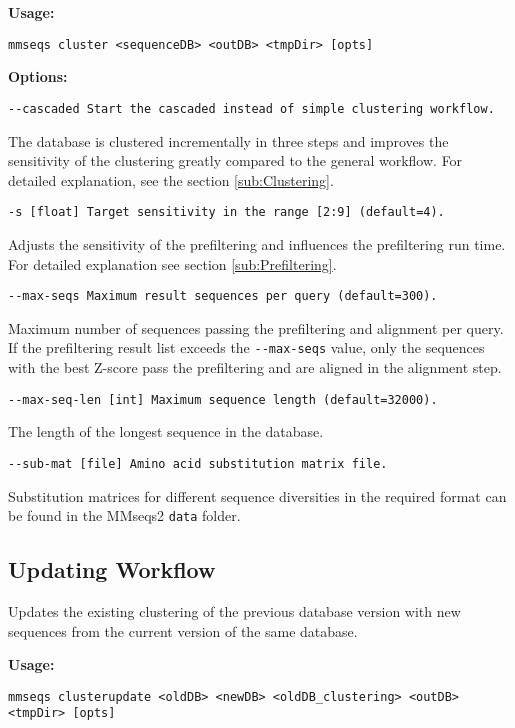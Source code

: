 \documentclass[11pt,a4paper]{scrreprt}
\begin{document}
\textbf{Usage:}

\texttt{mmseqs cluster  <sequenceDB> <outDB> <tmpDir> {[}opts{]}}

\textbf{Options:}

\texttt{\small -{}-cascaded Start the cascaded instead of simple clustering workflow.}{\small \par}

The database is clustered incrementally in three steps and improves the sensitivity of the clustering greatly compared to the general workflow. For detailed explanation, see the section \ref{sub:Clustering}.

\texttt{\small -s {[}float{]} Target sensitivity in the range {[}2:9{]} (default=4).}{\small \par}

Adjusts the sensitivity of the prefiltering and influences the prefiltering run time. For detailed explanation see section \ref{sub:Prefiltering}.

\texttt{\small -{}-max-seqs Maximum result sequences per query (default=300).}{\small \par}

Maximum number of sequences passing the prefiltering and alignment per query. If the prefiltering result list exceeds the \texttt{-{}-max-seqs} value, only the sequences with the best Z-score pass the prefiltering and are aligned in the alignment step.

\texttt{\small -{}-max-seq-len {[}int{]} Maximum sequence length (default=32000).}{\small \par}

The length of the longest sequence in the database.

\texttt{\small -{}-sub-mat {[}file{]} Amino acid substitution matrix file.}{\small \par}

Substitution matrices for different sequence diversities in the required format can be found in the MMseqs2 \texttt{data} folder.
\subsection{Updating Workflow}
Updates the existing clustering of the previous database version with new sequences from the current version of the same database.

\textbf{Usage:}

\texttt{mmseqs clusterupdate <oldDB> <newDB> <oldDB\_clustering> <outDB> <tmpDir> {[}opts{]}}
\end{document}
